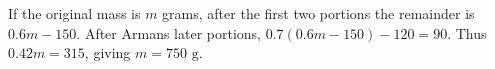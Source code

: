 If the original mass is $m$ grams, after the first two portions the remainder is $0.6m-150$. After Arman\textquotesingle s later portions, $0.7(0.6m-150)-120=90$. Thus $0.42m=315$, giving $\boxed{m=750\text{ g}}$.

